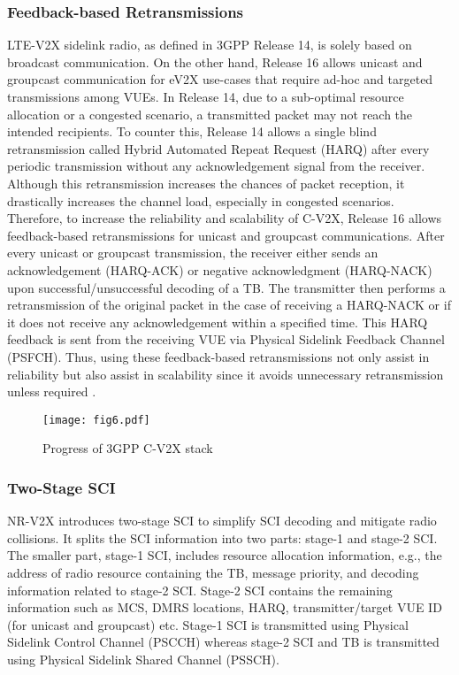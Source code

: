 \documentclass[iicol]{sn-jnl}%
\theoremstyle{thmstyleone}%
\theoremstyle{thmstyletwo}%
\theoremstyle{thmstylethree}%
\begin{document}
\subsubsection{Feedback-based Retransmissions}\label{subsec7.1.2}
LTE-V2X sidelink radio, as defined in 3GPP Release 14, is solely based on broadcast communication. On the other hand, Release 16 allows unicast and groupcast communication for eV2X use-cases that require ad-hoc and targeted transmissions among VUEs. In Release 14, due to a sub-optimal resource allocation or a congested scenario, a transmitted packet may not reach the intended recipients. To counter this, Release 14 allows a single blind retransmission called Hybrid Automated Repeat Request (HARQ) after every periodic transmission without any acknowledgement signal from the receiver. Although this retransmission increases the chances of packet reception, it drastically increases the channel load, especially in congested scenarios. Therefore, to increase the reliability and scalability of C-V2X, Release 16 allows feedback-based retransmissions for unicast and groupcast communications. After every unicast or groupcast transmission, the receiver either sends an acknowledgement (HARQ-ACK) or negative acknowledgment (HARQ-NACK) upon successful/unsuccessful decoding of a TB. The transmitter then performs a retransmission of the original packet in the case of receiving a HARQ-NACK or if it does not receive any acknowledgement within a specified time. This HARQ feedback is sent from the receiving VUE via Physical Sidelink Feedback Channel (PSFCH). Thus, using these feedback-based retransmissions not only assist in reliability but also assist in scalability since it avoids unnecessary retransmission unless required \cite{ali20213gpp}.

\begin{figure}[t]
\centerline{\texttt{[image: fig6.pdf]}}
\caption{Progress of 3GPP C-V2X stack}
\label{fig:C-V2X evolution}
\end{figure}

\subsubsection{Two-Stage SCI}\label{subsec7.1.3}
NR-V2X introduces two-stage SCI to simplify SCI decoding and mitigate radio collisions. It splits the SCI information into two parts: stage-1 and stage-2 SCI. The smaller part, stage-1 SCI, includes resource allocation information, e.g., the address of radio resource containing the TB, message priority, and decoding information related to stage-2 SCI. Stage-2 SCI contains the remaining information such as MCS, DMRS locations, HARQ, transmitter/target VUE ID (for unicast and groupcast) etc. Stage-1 SCI is transmitted using Physical Sidelink Control Channel (PSCCH) whereas stage-2 SCI and TB is transmitted using Physical Sidelink Shared Channel (PSSCH).
\end{document}
